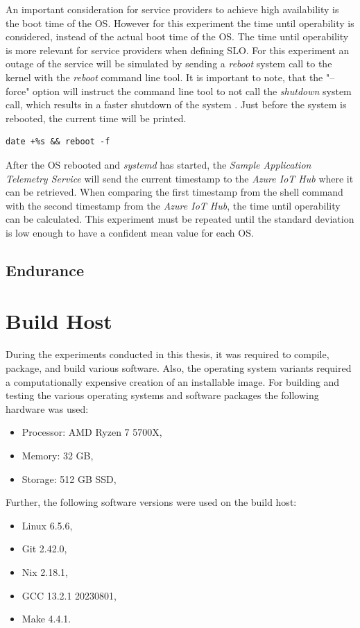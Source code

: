 An important consideration for service providers to achieve high
availability is the boot time of the \ac{OS}. However for this experiment the
time until operability is considered, instead of the actual boot time of the
\ac{OS}. The time until operability is more relevant for service providers
when defining \ac{SLO}.
For this experiment an outage of the service will be simulated by sending a
\textit{reboot} system call to the kernel with the \textit{reboot}
command line tool. It is important to note, that the "--force" option will
instruct the command line tool to not call the \textit{shutdown} system call,
which results in a faster shutdown of the system \cite{man-reboot}\cite{man-shutdown}.
Just before the system is rebooted, the current time will be printed.
\\

\begin{lstlisting}[caption=Command to print the current time and reboot]
date +%s && reboot -f
\end{lstlisting}
After the \ac{OS} rebooted and \textit{systemd} has started, the
\textit{Sample Application Telemetry Service} will send the current timestamp
to the \textit{Azure IoT Hub} where it can be retrieved. When comparing
the first timestamp from the shell command with the second timestamp from
the \textit{Azure IoT Hub}, the time until operability can be calculated.
This experiment must be repeated until the standard deviation is low enough
to have a confident mean value for each \ac{OS}.



\subsection{Endurance}

\section{Build Host}
During the experiments conducted in this thesis, it was
required to compile, package, and build various software.
Also, the operating system variants required a
computationally expensive creation of an installable image.
For building and testing the various operating systems and
software packages the following hardware was used:
\begin{itemize}
    \item Processor: AMD Ryzen 7 5700X,
    \item Memory: 32 GB,
    \item Storage: 512 GB SSD,
\end{itemize}

Further, the following software versions were used on the build host:
\begin{itemize}
    \item Linux 6.5.6,
    \item Git 2.42.0,
    \item Nix 2.18.1,
    \item GCC 13.2.1 20230801,
    \item Make 4.4.1.
\end{itemize}
